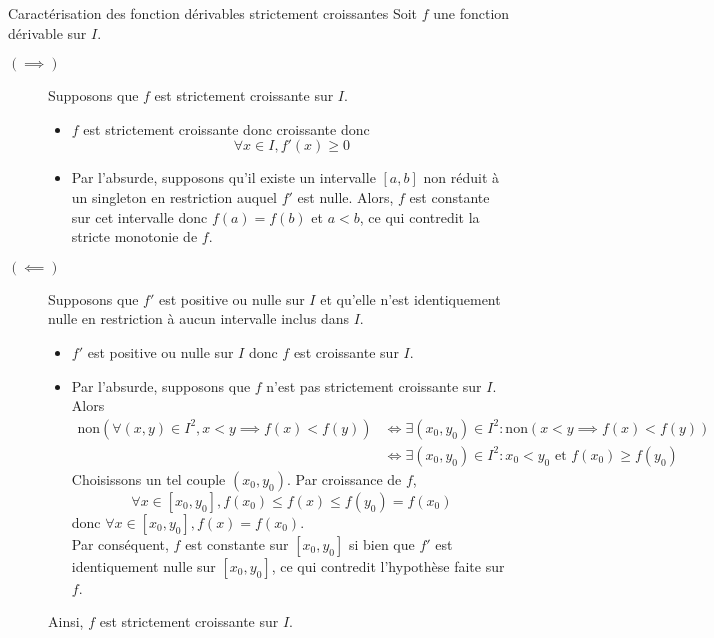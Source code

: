 \documentclass{article}
\renewenvironment{question_kholle}[2][ ]
{
	\subsection{\texorpdfstring{#2}{}}
	\notblank{#1}
	{
		\noindent #1
		\bigbreak
	}
	{}
	\begin{proof}
}
{
	\end{proof}
}
\begin{document}
\begin{question_kholle}{Caractérisation des fonction dérivables strictement croissantes}
	Soit $f$ une fonction dérivable sur $I$.
	\begin{description}
		\item[$(\implies)$] Supposons que $f$ est strictement croissante sur $I$.
		      \begin{itemize}
			      \item $f$ est strictement croissante donc croissante donc
			            \[
				            \forall x\in I, f'(x)\geq 0
			            \]
			      \item Par l’absurde, supposons qu’il existe un intervalle $[a,b]$ non réduit à un singleton en restriction auquel $f'$ est nulle. Alors, $f$ est constante sur cet intervalle donc $f(a)=f(b)$ et $a<b$, ce qui contredit la stricte monotonie de $f$.
		      \end{itemize}
		\item [$(\impliedby )$] Supposons que $f'$ est positive ou nulle sur $I$ et qu’elle n’est identiquement nulle en restriction à aucun intervalle inclus dans $I$.
		      \begin{itemize}
			      \item $f'$ est positive ou nulle sur $I$ donc $f$ est croissante sur $I$.
			      \item Par l’absurde, supposons que $f$ n’est pas strictement croissante sur $I$. Alors
			            \begin{align*}
				            \mathrm{non}(\forall (x,y)\in I^{2}, x<y \implies  f(x)<f(y)) & \iff \exists (x_{0},y_{0})\in I^{2}: \mathrm{non}(x<y \implies f(x)<f(y))          \\
				                                                                          & \iff \exists (x_{0},y_{0})\in I^{2}: x_{0}<y_{0} \text{ et } f(x_{0})\geq f(y_{0})
			            \end{align*}
			            Choisissons un tel couple $(x_{0},y_{0})$. Par croissance de $f$,
			            \[
				            \forall x\in [x_{0},y_{0}], f(x_{0})\leq f(x)\leq f(y_{0})=f(x_{0})
			            \]
			            donc $\forall x\in[x_{0},y_{0}], f(x)=f(x_{0})$.\\
			            Par conséquent, $f$ est constante sur $[x_{0}, y_{0}]$ si bien que $f'$ est identiquement nulle sur $[x_{0}, y_{0}]$, ce qui contredit l’hypothèse faite sur $f$.
		      \end{itemize}
		      Ainsi, $f$ est strictement croissante sur $I$.
	\end{description}
\end{question_kholle}
\end{document}
